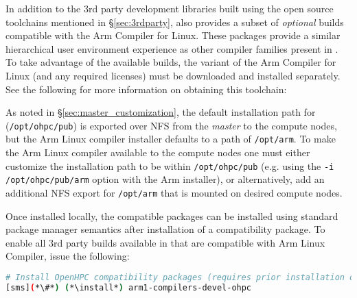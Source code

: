 In addition to the 3rd party development libraries built using the open source
toolchains mentioned in \S\ref{sec:3rdparty}, \OHPC{} also provides a subset of
{\em optional} builds compatible with the Arm Compiler for Linux.
These packages provide a similar hierarchical user environment experience as
other compiler families present in \OHPC{}.  To take advantage of the
available builds, the \OHPC{} variant of the Arm Compiler for Linux (and any
required licenses) must be downloaded and installed separately. See the
following for more information on obtaining this toolchain:

\begin{center}
  \href{https://developer.arm.com/tools-and-software/server-and-hpc/downloads/arm-allinea-studio/openhpc}
       {\color{blue}{https://developer.arm.com/tools-and-software/server-and-hpc/downloads/arm-allinea-studio/openhpc}}
\end{center}



\begin{center}
\begin{tcolorbox}[]
As noted in \S\ref{sec:master_customization}, the default installation path for
\OHPC{} (\texttt{/opt/ohpc/pub}) is exported over NFS from the {\em master} to the 
compute nodes, but the Arm Linux compiler installer defaults to a path of 
\texttt{/opt/arm}. To make the Arm Linux compiler available to the compute 
nodes one must either customize the installation path to be 
within \texttt{/opt/ohpc/pub} (e.g. using the \texttt{-i /opt/ohpc/pub/arm}
option with the Arm installer), or alternatively, add an additional NFS export
for \texttt{/opt/arm} that is mounted on desired compute nodes.
\end{tcolorbox}
\end{center}

Once installed locally, the \OHPC{}
compatible packages can be installed using standard package manager semantics
after installation of a compatibility package.
\noindent To enable all 3rd party builds available in \OHPC{} that are compatible with
Arm Linux Compiler, issue the following:

\begin{lstlisting}[language=bash,keywords={},upquote=true,keepspaces]
# Install OpenHPC compatibility packages (requires prior installation of Arm Linux Compiler)
[sms](*\#*) (*\install*) arm1-compilers-devel-ohpc
\end{lstlisting}

